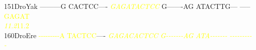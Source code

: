 \documentclass[11pt,twoside,reqno,a4paper]{article}
\begin{document}
{151\hspace*{1\charwidth}DroYak	---------G	CACTCC----	\textit{\textcolor{Yellow}{G}}\textit{\textcolor{Yellow}{A}}\textit{\textcolor{Yellow}{G}}\textit{\textcolor{Yellow}{A}}\textit{\textcolor{Yellow}{T}}\textit{\textcolor{Yellow}{A}}\textit{\textcolor{Yellow}{C}}\textit{\textcolor{Yellow}{T}}\textit{\textcolor{Yellow}{C}}\textit{\textcolor{Yellow}{C}}	G-------AG	ATACTTG---	-----\textcolor{Yellow}{G}\textcolor{Yellow}{A}\textcolor{Yellow}{G}\textcolor{Yellow}{A}\textcolor{Yellow}{T}	\\
\hspace*{4\charwidth}\hspace*{7\charwidth}\hspace*{1\charwidth}\hspace*{1\charwidth}\hspace*{20\charwidth}\textit{\textcolor{Yellow}{11.2}}\hspace*{1\charwidth}\hspace*{1\charwidth}\hspace*{1\charwidth}\hspace*{31\charwidth}\textcolor{Yellow}{11.2}\hspace*{1\charwidth}\\
160\hspace*{1\charwidth}DroEre	\textcolor{Yellow}{-}\textcolor{Yellow}{-}\textcolor{Yellow}{-}\textcolor{Yellow}{-}\textcolor{Yellow}{-}\textcolor{Yellow}{-}\textcolor{Yellow}{-}\textcolor{Yellow}{-}\textcolor{Yellow}{-}\textcolor{Yellow}{A}	\textcolor{Yellow}{T}\textcolor{Yellow}{A}\textcolor{Yellow}{C}\textcolor{Yellow}{T}\textcolor{Yellow}{C}\textcolor{Yellow}{C}----	\textit{\textcolor{Yellow}{G}}\textit{\textcolor{Yellow}{A}}\textit{\textcolor{Yellow}{G}}\textit{\textcolor{Yellow}{A}}\textit{\textcolor{Yellow}{C}}\textit{\textcolor{Yellow}{A}}\textit{\textcolor{Yellow}{C}}\textit{\textcolor{Yellow}{T}}\textit{\textcolor{Yellow}{C}}\textit{\textcolor{Yellow}{C}}	\textit{\textcolor{Yellow}{G}}\textit{\textcolor{Yellow}{-}}\textit{\textcolor{Yellow}{-}}\textit{\textcolor{Yellow}{-}}\textit{\textcolor{Yellow}{-}}\textit{\textcolor{Yellow}{-}}\textit{\textcolor{Yellow}{-}}\textit{\textcolor{Yellow}{-}}\textit{\textcolor{Yellow}{A}}\textit{\textcolor{Yellow}{G}}	\textit{\textcolor{Yellow}{A}}\textit{\textcolor{Yellow}{T}}\textit{\textcolor{Yellow}{A}}\textit{\textcolor{Yellow}{-}}\textit{\textcolor{Yellow}{-}}\textit{\textcolor{Yellow}{-}}\textit{\textcolor{Yellow}{-}}\textit{\textcolor{Yellow}{-}}\textit{\textcolor{Yellow}{-}}\textit{\textcolor{Yellow}{-}}	\textit{\textcolor{Yellow}{-}}\textit{\textcolor{Yellow}{-}}\textit{\textcolor{Yellow}{-}}\textit{\textcolor{Yellow}{-}}\textit{\textcolor{Yellow}{-}}\textit{\textcolor{Yellow}{-}}\textit{\textcolor{Yellow}{-}}\textit{\textcolor{Yellow}{-}}\textit{\textcolor{Yellow}{-}}\textit{\textcolor{Yellow}{-}}	\\
}
\end{document}
